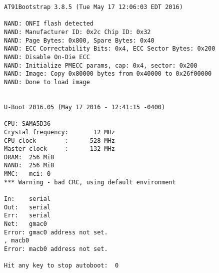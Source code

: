\begin{verbatim}
AT91Bootstrap 3.8.5 (Tue May 17 12:06:03 EDT 2016)

NAND: ONFI flash detected
NAND: Manufacturer ID: 0x2c Chip ID: 0x32
NAND: Page Bytes: 0x800, Spare Bytes: 0x40
NAND: ECC Correctability Bits: 0x4, ECC Sector Bytes: 0x200
NAND: Disable On-Die ECC
NAND: Initialize PMECC params, cap: 0x4, sector: 0x200
NAND: Image: Copy 0x80000 bytes from 0x40000 to 0x26f00000
NAND: Done to load image


U-Boot 2016.05 (May 17 2016 - 12:41:15 -0400)

CPU: SAMA5D36
Crystal frequency:       12 MHz
CPU clock        :      528 MHz
Master clock     :      132 MHz
DRAM:  256 MiB
NAND:  256 MiB
MMC:   mci: 0
*** Warning - bad CRC, using default environment

In:    serial
Out:   serial
Err:   serial
Net:   gmac0
Error: gmac0 address not set.
, macb0
Error: macb0 address not set.

Hit any key to stop autoboot:  0 
\end{verbatim}
